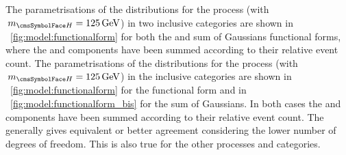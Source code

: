 \ifNewAnalysis
The parametrisations of the \mgg distributions for the \ggH process (with $\mH=125\GeV$) in two inclusive categories are shown in \Fig~\ref{fig:model:functionalform} for both the \DCBpG and sum of Gaussians functional forms, where the \RV and \WV components have been summed according to their relative event count. %
\else
The parametrisations of the \mgg distributions for the \ggH process (with $\mH=125\GeV$) in the inclusive categories are shown in \Fig~\ref{fig:model:functionalform} for the \DCBpG functional form and in \Fig~\ref{fig:model:functionalform_bis} for the sum of Gaussians. In both cases the \RV and \WV components have been summed according to their relative event count. %
\fi
The \DCBpG generally gives equivalent or better agreement considering the lower number of degrees of freedom. This is also true for the other processes and categories.

